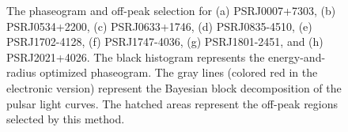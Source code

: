 \begin{figure}
  \ifdefined\bwfigures
  \else
  \fi
  \caption{The phaseogram and off-peak selection for 
  (a) PSRJ0007+7303, (b) PSRJ0534+2200, (c) PSRJ0633+1746, (d) PSRJ0835-4510,
  (e) PSRJ1702-4128, (f) PSRJ1747-4036, (g) PSRJ1801-2451, and (h) PSRJ2021+4026.
  The black histogram represents the energy-and-radius optimized phaseogram.
  The gray lines (colored red in the electronic version)
  represent the Bayesian block decomposition of the pulsar light curves.
  The hatched areas represent the off-peak regions selected by this method.}
  \label{fig:off_peak_select}
\end{figure}

